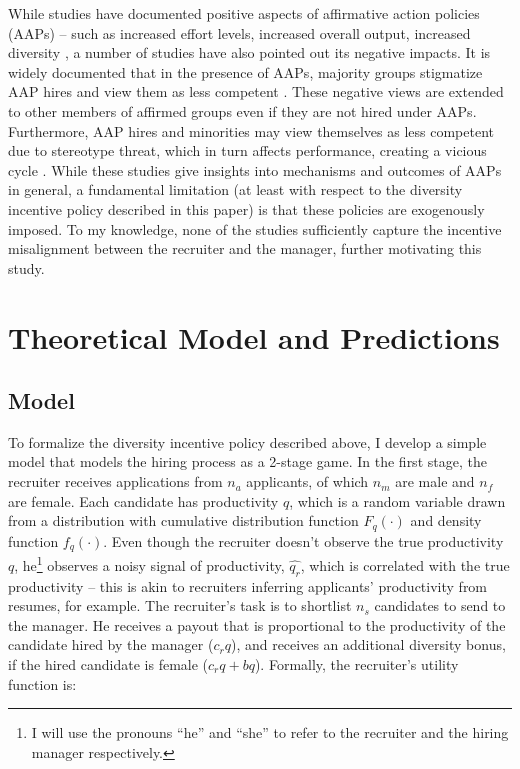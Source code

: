 \documentclass[11pt]{article}
\begin{document}
While studies have documented positive aspects of affirmative action policies (AAPs) -- such as increased effort levels, increased overall output, increased diversity \parencite{schotter_asymmetric_1992,balafoutas_affirmative_2012,niederle_how_2012}, a number of studies have also pointed out its negative impacts. It is widely documented that in the presence of AAPs, majority groups stigmatize AAP hires and view them as less competent \parencite{leslie_stigma_2013,heilman_affirmative_1997,petters_negative_2020}. These negative views are extended to other members of affirmed groups even if they are not hired under AAPs. Furthermore, AAP hires and minorities may view themselves as less competent due to stereotype threat, which in turn affects performance, creating a vicious cycle \parencite{leslie_stigma_2013}. While these studies give insights into mechanisms and outcomes of AAPs in general, a fundamental limitation (at least with respect to the diversity incentive policy described in this paper) is that these policies are exogenously imposed. To my knowledge, none of the studies sufficiently capture the incentive misalignment between the recruiter and the manager, further motivating this study.


\section{Theoretical Model and Predictions}

\subsection{Model}

To formalize the diversity incentive policy described above, I develop a simple model that models the hiring process as a 2-stage game.
In the first stage, the recruiter receives applications from $n_a$ applicants, of which $n_m$ are male and $n_f$ are female. Each candidate has productivity $q$, which is a random variable drawn from a distribution with cumulative distribution function $F_q(\cdot)$ and density function $f_q(\cdot)$. Even though the recruiter doesn't observe the true productivity $q$, he\footnote{I will use the pronouns ``he'' and ``she'' to refer to the recruiter and the hiring manager respectively.} observes a noisy signal of productivity, $\hat{q_r}$, which is correlated with the true productivity -- this is akin to recruiters inferring applicants' productivity from resumes, for example.
The recruiter's task is to shortlist $n_s$ candidates to send to the manager. He receives a payout that is proportional to the productivity of the candidate hired by the manager ($c_rq$), and receives an additional diversity bonus, if the hired candidate is female ($c_rq + bq$). Formally, the recruiter's utility function is:
\end{document}
